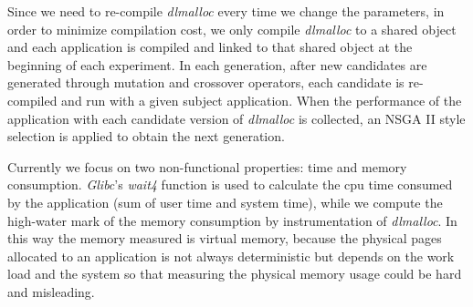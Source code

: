 Since we need to re-compile \emph{dlmalloc} every time we change the parameters, in order to minimize compilation cost, we only compile \emph{dlmalloc} to a shared object and each application is compiled and linked to that shared object at the beginning of each experiment. In each generation, after new candidates are generated through mutation and crossover operators, each candidate is re-compiled and run with a given subject application. When the performance of the application with each candidate version of \emph{dlmalloc} is collected, an NSGA II style selection is applied to obtain the next generation.

Currently we focus on two non-functional properties: time and memory consumption. \emph{Glibc}'s \emph{wait4} function is used to calculate the cpu time consumed by the application (sum of user time and system time), while we compute the high-water mark of the memory consumption by instrumentation of \emph{dlmalloc}. In this way the memory measured is virtual memory, because the physical pages allocated to an application is not always deterministic but depends on the work load and the system so that measuring the physical memory usage could be hard and misleading.

